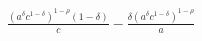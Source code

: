 $\displaystyle \frac{\left(a^{\delta} c^{1 - \delta}\right)^{1 - \rho} \left(1 - \delta\right)}{c} - \frac{\delta \left(a^{\delta} c^{1 - \delta}\right)^{1 - \rho}}{a}$
